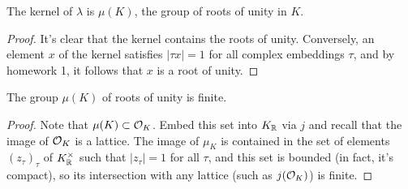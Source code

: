 \begin{proposition}
  The kernel of $\lambda$ is $\mu(K)$, the group of roots of unity in $K$.
\end{proposition}
\begin{proof}
  It's clear that the kernel contains the roots of unity.
  Conversely, an element $x$ of the kernel satisfies $|\tau x| = 1$ for all complex embeddings $\tau$, and by homework 1, it follows that $x$ is a root of unity.
\end{proof}

\begin{proposition}
  The group $\mu(K)$ of roots of unity is finite.
\end{proposition}
\begin{proof}
  Note that $\mu(K) \subset \mathcal{O}_{K}$.
  Embed this set into $K_{\mathbb{R}}$ via $j$ and recall that the image of $\mathcal{O}_{K}$ is a lattice.
  The image of $\mu_{K}$ is contained in the set of elements $(z_{\tau})_{\tau}$ of $K_{\mathbb{R}}^{\times}$ such that $|z_{\tau}| = 1$ for all $\tau$, and this set is bounded (in fact, it's compact), so its intersection with any lattice (such as $j(\mathcal{O}_{K})$) is finite.
\end{proof}

